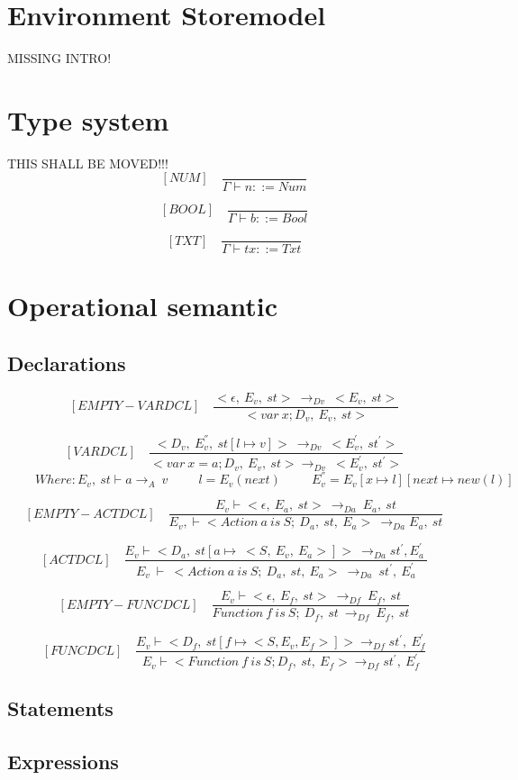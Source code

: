   
  \section{Environment Storemodel}
  MISSING INTRO!
  
  
  
  \section{Type system}
  THIS SHALL BE MOVED!!!
	\[
	[NUM] \quad
	\dfrac{}{\Gamma \vdash n ::= Num}
	\]
	 
	\[
	[BOOL] \quad
	\dfrac{}{\Gamma \vdash b ::= Bool}
	\]
	
  	\[
  	[TXT] \quad
  	\dfrac{}{\Gamma \vdash tx ::= Txt}
  	\]
  	
  \section{Operational semantic}
  
  \subsection{Declarations}
  	\[
	[EMPTY-VARDCL] \quad
	\dfrac{<\epsilon, \ E_v, \ st> \ \rightarrow_{Dv} \ <E_v, \ st> }{<var \ x; D_v,\ E_v,\ st>}
	\]
    	
   	\[
   	[VARDCL] \quad
   	\dfrac{<D_v, \ E_v^{''}, \ st[l \mapsto v]> \ \rightarrow_{Dv} \ <E_v^{'}, \ st^{'}> }{<var \ x = a; D_v,\ E_v,\ st> \rightarrow_{Dv} \ <E_v^{'}, \ st^{'}>}
   	\]
   	\begin{math}
 	  	\qquad \ Where: E_v, \ st \vdash a \rightarrow_A \ v
 	  	\qquad \ \ l = E_v(next)
 	  	\qquad \ \ E_v^{''} = E_v[x \mapsto l][next \mapsto new(l)]
   	\end{math}
    	
   	\[
   	[EMPTY-ACTDCL] \quad
   	\dfrac{E_v \vdash <\epsilon, \ E_a, \ st> \ \rightarrow_{Da} \ E_a, \ st}{ E_v, \vdash  <Action \ a \ is \ S; \ D_a, \ st, \ E_a> \ \rightarrow_{Da} E_a, \ st }
   	\]
    	
    	
  	\[
   	[ACTDCL] \quad
   	\dfrac{E_v \vdash <D_a, \ st[a \mapsto \ <S, \ E_v, \ E_a>]>   \ \rightarrow_{Da} st^{'}, E_a^{'} \ }{E_v \ \vdash \ <Action \ a \ is \ S; \ D_a, \ st, \ E_a> \ \rightarrow_{Da} \ st^{'}, \ E_a^{'}}
   	\]
    	
   	\[
   	[EMPTY-FUNCDCL] \quad
   	\dfrac{E_v \vdash < \epsilon, \ E_f, \ st> \ \rightarrow_{Df} \ E_f, \ st}{Function \ f \ is \ S; \ D_f, \ st \ \rightarrow_{Df} \ E_f, \ st}
   	\]
   	
   	\[
   	[FUNCDCL] \quad
   	\dfrac{E_v \vdash <D_f, \ st[f \mapsto <S, E_v, E_f>]> \rightarrow_{Df} st^{'}, \ E_f^{'}}{E_v \vdash <Function \ f \ is \ S; D_f, \ st, \ E_f > \rightarrow_{Df} st^{'}, \ E_f^{'}}
   	\]
   	
   	\subsection{Statements}
   	
   	\subsection{Expressions}
   	